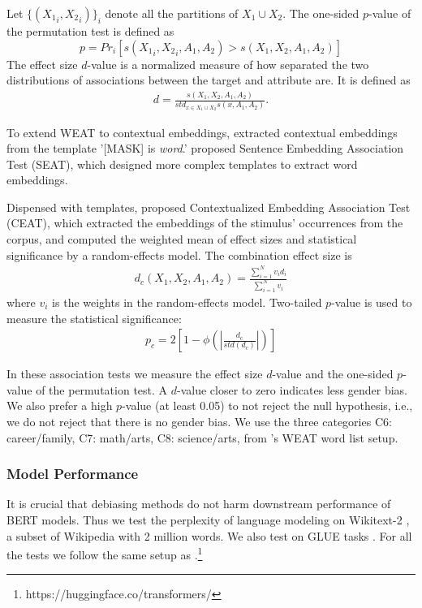 Let $\{({X_1}_i,{X_2}_i)\}_{i}$ denote all the partitions of $X_1\cup X_2$. The one-sided $p$-value of the permutation test is defined as $$p=Pr_i[s({X_1}_i,{X_2}_i,A_1,A_2)>s(X_1,X_2,A_1,A_2)]$$
The effect size $d$-value is a normalized measure of how separated the two distributions of associations between the target and attribute are. It is defined as
\begin{eqnarray}
d=\frac{s(X_1,X_2,A_1,A_2)}{std_{x\in X_1 \cup X_2}s(x,A_1,A_2)}.\nonumber
\end{eqnarray}

To extend WEAT to contextual embeddings, \cite{karve2019conceptor} extracted contextual embeddings from the template '[MASK] is \textit{word}.' \cite{may2019measuring} proposed Sentence Embedding Association Test (SEAT), which designed more complex templates to extract word embeddings. 

Dispensed with templates, \cite{guo2020detecting} proposed Contextualized Embedding Association Test (CEAT), which extracted the embeddings of the stimulus' occurrences from the corpus, and computed the weighted mean of effect sizes and statistical significance by a random-effects model. The combination effect size is
\begin{eqnarray}
d_c(X_1,X_2,A_1,A_2)=\frac{\sum_{i=1}^{N}v_id_i}{\sum_{i=1}^{N}v_i}\nonumber
\end{eqnarray} 
where $v_i$ is the weights in the random-effects model. Two-tailed $p$-value is used to measure the statistical significance:
\begin{eqnarray}
	p_c = 2[1-\phi(|\frac{d_c}{std(d_c)}|)]\nonumber
\end{eqnarray}

In these association tests we measure the effect size $d$-value and the
one-sided $p$-value of the permutation test.  A $d$-value
closer to zero indicates less gender bias.  We also prefer a
high $p$-value (at least 0.05) to not reject the null
hypothesis, i.e., we do not reject that there is no gender
bias. We use the three categories C6: career/family, C7: math/arts, C8: science/arts, from \cite{karve2019conceptor}'s WEAT word list
setup.

\subsubsection{Model Performance}
It is crucial that debiasing methods do not harm downstream
performance of BERT models. Thus we test the perplexity of
language modeling on Wikitext-2
\cite{merity2016pointer}, a subset of Wikipedia with 2
million words. We also test on GLUE tasks
\cite{wang2018glue}. For all the tests we follow the same
setup as
\cite{wolf2019huggingfaces}.\footnote{https://huggingface.co/transformers/}
